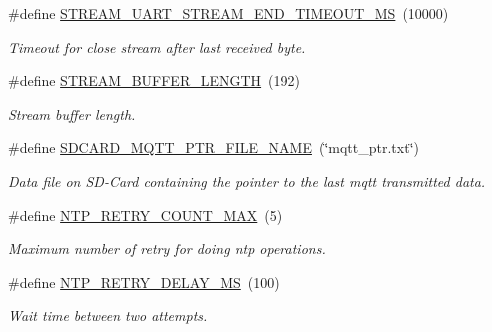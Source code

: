\begin{DoxyCompactItemize}
\mbox{\label{rmap-config_8h_a950ba415f1afc5bdc2d4ea52b51075df}} 
\#define \hyperlink{rmap-config_8h_a950ba415f1afc5bdc2d4ea52b51075df}{S\+T\+R\+E\+A\+M\+\_\+\+U\+A\+R\+T\+\_\+\+S\+T\+R\+E\+A\+M\+\_\+\+E\+N\+D\+\_\+\+T\+I\+M\+E\+O\+U\+T\+\_\+\+MS}~(10000)
\begin{DoxyCompactList}\small\item\em Timeout for close stream after last received byte. \end{DoxyCompactList}\item 
\mbox{\label{rmap-config_8h_ac5fc989b784c420be7db4f66417fc744}} 
\#define \hyperlink{rmap-config_8h_ac5fc989b784c420be7db4f66417fc744}{S\+T\+R\+E\+A\+M\+\_\+\+B\+U\+F\+F\+E\+R\+\_\+\+L\+E\+N\+G\+TH}~(192)
\begin{DoxyCompactList}\small\item\em Stream buffer length. \end{DoxyCompactList}\item 
\mbox{\label{rmap-config_8h_a7470ca0f869e88a49d4d70bad5de69e6}} 
\#define \hyperlink{rmap-config_8h_a7470ca0f869e88a49d4d70bad5de69e6}{S\+D\+C\+A\+R\+D\+\_\+\+M\+Q\+T\+T\+\_\+\+P\+T\+R\+\_\+\+F\+I\+L\+E\+\_\+\+N\+A\+ME}~(\char`\"{}mqtt\+\_\+ptr.\+txt\char`\"{})
\begin{DoxyCompactList}\small\item\em Data file on S\+D-\/\+Card containing the pointer to the last mqtt transmitted data. \end{DoxyCompactList}\item 
\mbox{\label{rmap-config_8h_a5042473c874b6f184bd4dc197feadca9}} 
\#define \hyperlink{rmap-config_8h_a5042473c874b6f184bd4dc197feadca9}{N\+T\+P\+\_\+\+R\+E\+T\+R\+Y\+\_\+\+C\+O\+U\+N\+T\+\_\+\+M\+AX}~(5)
\begin{DoxyCompactList}\small\item\em Maximum number of retry for doing ntp operations. \end{DoxyCompactList}\item 
\mbox{\label{rmap-config_8h_aee0934e91270bda3cc3fcaa9082fadc8}} 
\#define \hyperlink{rmap-config_8h_aee0934e91270bda3cc3fcaa9082fadc8}{N\+T\+P\+\_\+\+R\+E\+T\+R\+Y\+\_\+\+D\+E\+L\+A\+Y\+\_\+\+MS}~(100)
\begin{DoxyCompactList}\small\item\em Wait time between two attempts. \end{DoxyCompactList}\item 

\end{DoxyCompactItemize}
